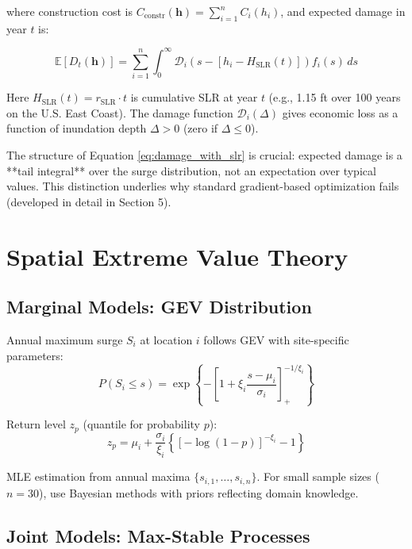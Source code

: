 \documentclass[review]{elsarticle}
\begin{document}
where construction cost is $C_{\text{constr}}(\mathbf{h}) = \sum_{i=1}^n C_i(h_i)$, and expected damage in year $t$ is:

\begin{equation}
\mathbb{E}[D_t(\mathbf{h})] = \sum_{i=1}^{n} \int_0^\infty \mathcal{D}_i\left(s - [h_i - H_{\text{SLR}}(t)]\right) f_i(s) \, ds
\label{eq:damage_with_slr}
\end{equation}

Here $H_{\text{SLR}}(t) = r_{\text{SLR}} \cdot t$ is cumulative SLR at year $t$ (e.g., 1.15 ft over 100 years on the U.S. East Coast). The damage function $\mathcal{D}_i(\Delta)$ gives economic loss as a function of inundation depth $\Delta > 0$ (zero if $\Delta \leq 0$).

The structure of Equation \eqref{eq:damage_with_slr} is crucial: expected damage is a **tail integral** over the surge distribution, not an expectation over typical values. This distinction underlies why standard gradient-based optimization fails (developed in detail in Section 5).

\section{Spatial Extreme Value Theory}

\subsection{Marginal Models: GEV Distribution}

Annual maximum surge $S_i$ at location $i$ follows GEV with site-specific parameters:
\begin{equation}
P(S_i \leq s) = \exp\left\{-\left[1 + \xi_i\frac{s-\mu_i}{\sigma_i}\right]_+^{-1/\xi_i}\right\}
\label{eq:gev_marginal}
\end{equation}

Return level $z_p$ (quantile for probability $p$):
\begin{equation}
z_p = \mu_i + \frac{\sigma_i}{\xi_i}\left\{[-\log(1-p)]^{-\xi_i} - 1\right\}
\end{equation}

MLE estimation from annual maxima $\{s_{i,1}, \ldots, s_{i,n}\}$. For small sample sizes ($n=30$), use Bayesian methods with priors reflecting domain knowledge.

\subsection{Joint Models: Max-Stable Processes}
\end{document}
